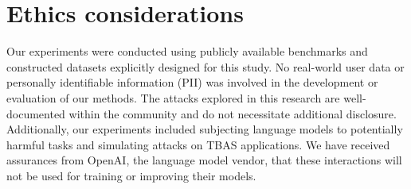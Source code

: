 \section{Ethics considerations}

Our experiments were conducted using publicly available benchmarks and constructed datasets explicitly designed for this study. No real-world user data or personally identifiable information (PII) was involved in the development or evaluation of our methods. The attacks explored in this research are well-documented within the community and do not necessitate additional disclosure. Additionally, our experiments included subjecting language models to potentially harmful tasks and simulating attacks on TBAS applications. We have received assurances from OpenAI, the language model vendor, that these interactions will not be used for training or improving their models.





